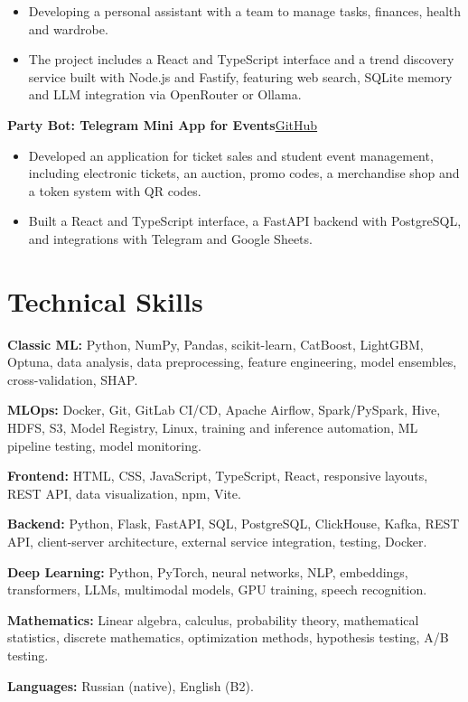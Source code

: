 \documentclass[a4paper,11pt]{article}
\newcommand{\project}[2]{\vspace{6pt}\textbf{#1}\hfill #2\par}
\newcommand{\gh}[1]{\href{#1}{GitHub}}
\begin{document}
\begin{itemize}
\item Developing a personal assistant with a team to manage tasks, finances, health and wardrobe.
\item The project includes a React and TypeScript interface and a trend discovery service built with Node.js and Fastify, featuring web search, SQLite memory and LLM integration via OpenRouter or Ollama.
\end{itemize}
\project{Party Bot: Telegram Mini App for Events}{\gh{https://github.com/baranczov/party_bot}}
\begin{itemize}
\item Developed an application for ticket sales and student event management, including electronic tickets, an auction, promo codes, a merchandise shop and a token system with QR codes.
\item Built a React and TypeScript interface, a FastAPI backend with PostgreSQL, and integrations with Telegram and Google Sheets.
\end{itemize}
\section*{Technical Skills}
\textbf{Classic ML:} Python, NumPy, Pandas, scikit-learn, CatBoost, LightGBM, Optuna, data analysis, data preprocessing, feature engineering, model ensembles, cross-validation, SHAP.\par
\textbf{MLOps:} Docker, Git, GitLab CI/CD, Apache Airflow, Spark/PySpark, Hive, HDFS, S3, Model Registry, Linux, training and inference automation, ML pipeline testing, model monitoring.\par
\textbf{Frontend:} HTML, CSS, JavaScript, TypeScript, React, responsive layouts, REST API, data visualization, npm, Vite.\par
\textbf{Backend:} Python, Flask, FastAPI, SQL, PostgreSQL, ClickHouse, Kafka, REST API, client-server architecture, external service integration, testing, Docker.\par
\textbf{Deep Learning:} Python, PyTorch, neural networks, NLP, embeddings, transformers, LLMs, multimodal models, GPU training, speech recognition.\par
\textbf{Mathematics:} Linear algebra, calculus, probability theory, mathematical statistics, discrete mathematics, optimization methods, hypothesis testing, A/B testing.\par
\textbf{Languages:} Russian (native), English (B2).
\end{document}
